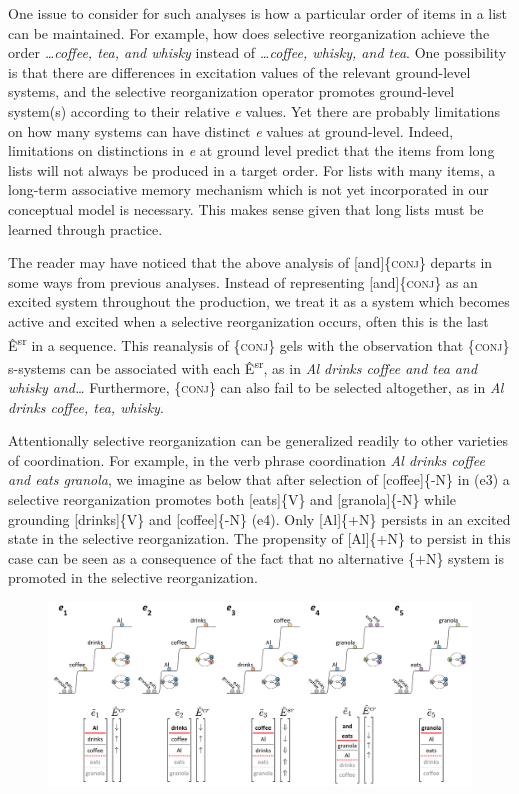   One issue to consider for such analyses is how a particular order of items in a list can be maintained. For example, how does selective reorganization achieve the order \textit{…coffee, tea, and whisky} instead of \textit{…coffee, whisky, and tea}. One possibility is that there are differences in excitation values of the relevant ground-level systems, and the selective reorganization operator promotes ground-level system(s) according to their relative \textit{e} values. Yet there are probably limitations on how many systems can have distinct \textit{e} values at ground-level. Indeed, limitations on distinctions in \textit{e} at ground level predict that the items from long lists will not always be produced in a target order. For lists with many items, a long-term associative memory mechanism which is not yet incorporated in our conceptual model is necessary. This makes sense given that long lists must be learned through practice.

  The reader may have noticed that the above analysis of [and]\{\textsc{conj}\} departs in some ways from previous analyses. Instead of representing [and]\{\textsc{conj}\} as an excited system throughout the production, we treat it as a system which becomes active and excited when a selective reorganization occurs, often this is the last Ê\textsuperscript{sr} in a sequence. This reanalysis of \{\textsc{conj}\} gels with the observation that \{\textsc{conj}\} s-systems can be associated with each Ê\textsuperscript{sr}, as in \textit{Al drinks coffee and tea and whisky and…} Furthermore, \{\textsc{conj}\} can also fail to be selected altogether, as in \textit{Al drinks coffee, tea, whisky}.

  Attentionally selective reorganization can be generalized readily to other varieties of coordination. For example, in the verb phrase coordination \textit{Al drinks coffee and eats granola}, we imagine as below that after selection of [coffee]\{-N\} in (e3) a selective reorganization promotes both [eats]\{V\} and [granola]\{-N\} while grounding [drinks]\{V\} and [coffee]\{-N\} (e4). Only [Al]\{+N\} persists in an excited state in the selective reorganization. The propensity of [Al]\{+N\} to persist in this case can be seen as a consequence of the fact that no alternative \{+N\} system is promoted in the selective reorganization.

  
\begin{figure}
\includegraphics[width=\textwidth]{figures/Tilsen-img100.png}
\caption{\missingcaption}
\label{fig:}
\end{figure}
 

